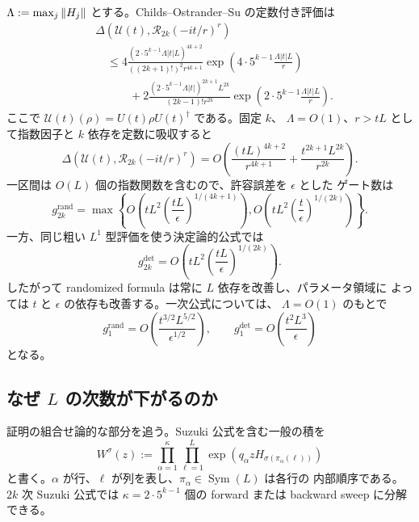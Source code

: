\documentclass[uplatex,dvipdfmx,11pt,a4paper]{jsarticle}
\newcommand{\cR}{\mathcal{R}}
\newcommand{\cU}{\mathcal{U}}
\newcommand{\Sym}{\operatorname{Sym}}
\newcommand{\chanerr}{\Delta}
\begin{document}
$\Lambda:=\max_j\norm{H_j}$ とする。Childs--Ostrander--Su の定数付き評価は
\begin{align}
  &\chanerr\left(
    \cU(t),\cR_{2k}(-it/r)^r
  \right)
  \nonumber\\
  &\quad\leq
  4\frac{(2\cdot5^{k-1}\Lambda|t|L)^{4k+2}}
  {((2k+1)!)^2r^{4k+1}}
  \exp\left(4\cdot5^{k-1}\frac{\Lambda|t|L}{r}\right)
  \nonumber\\
  &\qquad\quad+
  2\frac{(2\cdot5^{k-1}\Lambda|t|)^{2k+1}L^{2k}}
  {(2k-1)!r^{2k}}
  \exp\left(2\cdot5^{k-1}\frac{\Lambda|t|L}{r}\right).
  \label{eq:randomized-full-bound}
\end{align}
ここで $\cU(t)(\rho)=U(t)\rho U(t)^\dagger$ である。固定 $k$、
$\Lambda=O(1)$、$r>tL$ として指数因子と $k$ 依存を定数に吸収すると
\begin{equation}
  \chanerr\left(\cU(t),\cR_{2k}(-it/r)^r\right)
  =O\left(
    \frac{(tL)^{4k+2}}{r^{4k+1}}
    +\frac{t^{2k+1}L^{2k}}{r^{2k}}
  \right).
  \label{eq:randomized-asymptotic-error}
\end{equation}
一区間は $O(L)$ 個の指数関数を含むので、許容誤差を $\epsilon$ とした
ゲート数は
\begin{equation}
  g_{2k}^{\mathrm{rand}}
  =\max\left\{
    O\left(tL^2\left(\frac{tL}{\epsilon}\right)^{1/(4k+1)}\right),
    O\left(tL^2\left(\frac{t}{\epsilon}\right)^{1/(2k)}\right)
  \right\}.
  \label{eq:randomized-gate-count}
\end{equation}
一方、同じ粗い $L^1$ 型評価を使う決定論的公式では
\begin{equation}
  g_{2k}^{\mathrm{det}}
  =O\left(tL^2\left(\frac{tL}{\epsilon}\right)^{1/(2k)}\right).
\end{equation}
したがって randomized formula は常に $L$ 依存を改善し、パラメータ領域に
よっては $t$ と $\epsilon$ の依存も改善する。一次公式については、
$\Lambda=O(1)$ のもとで
\begin{equation}
  g_1^{\mathrm{rand}}
  =O\left(\frac{t^{3/2}L^{5/2}}{\epsilon^{1/2}}\right),
  \qquad
  g_1^{\mathrm{det}}
  =O\left(\frac{t^2L^3}{\epsilon}\right)
\end{equation}
となる。

\subsection{なぜ \texorpdfstring{$L$}{L} の次数が下がるのか}

証明の組合せ論的な部分を追う。Suzuki 公式を含む一般の積を
\begin{equation}
  W^\sigma(z)
  :=\prod_{\alpha=1}^{\kappa}
    \prod_{\ell=1}^{L}
    \exp\left(q_\alpha z
      H_{\sigma(\pi_\alpha(\ell))}\right)
  \label{eq:row-column-formula}
\end{equation}
と書く。$\alpha$ が行、$\ell$ が列を表し、$\pi_\alpha\in\Sym(L)$ は各行の
内部順序である。$2k$ 次 Suzuki 公式では
$\kappa=2\cdot5^{k-1}$ 個の forward または backward sweep に分解できる。
\end{document}

